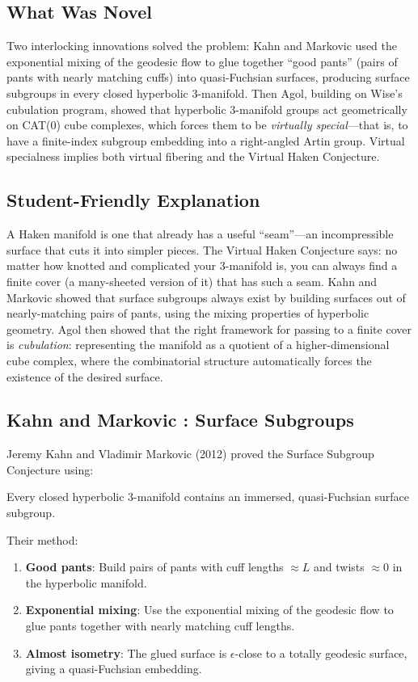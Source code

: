 \subsection{What Was Novel}
Two interlocking innovations solved the problem: Kahn and Markovic used the exponential mixing of the geodesic flow to glue together ``good pants'' (pairs of pants with nearly matching cuffs) into quasi-Fuchsian surfaces, producing surface subgroups in every closed hyperbolic 3-manifold. Then Agol, building on Wise's cubulation program, showed that hyperbolic 3-manifold groups act geometrically on CAT(0) cube complexes, which forces them to be \emph{virtually special}---that is, to have a finite-index subgroup embedding into a right-angled Artin group. Virtual specialness implies both virtual fibering and the Virtual Haken Conjecture.

\subsection{Student-Friendly Explanation}
A Haken manifold is one that already has a useful ``seam''---an incompressible surface that cuts it into simpler pieces. The Virtual Haken Conjecture says: no matter how knotted and complicated your 3-manifold is, you can always find a finite cover (a many-sheeted version of it) that has such a seam. Kahn and Markovic showed that surface subgroups always exist by building surfaces out of nearly-matching pairs of pants, using the mixing properties of hyperbolic geometry. Agol then showed that the right framework for passing to a finite cover is \emph{cubulation}: representing the manifold as a quotient of a higher-dimensional cube complex, where the combinatorial structure automatically forces the existence of the desired surface.

\subsection{Kahn and Markovic \cite{kahnmarkovic2012}: Surface Subgroups}
Jeremy Kahn and Vladimir Markovic (2012) proved the Surface Subgroup Conjecture using:

\begin{theorem}
Every closed hyperbolic 3-manifold contains an immersed, quasi-Fuchsian surface subgroup.
\end{theorem}

Their method:
\begin{enumerate}
\item \textbf{Good pants}: Build pairs of pants with cuff lengths $\approx L$ and twists $\approx 0$ in the hyperbolic manifold.
\item \textbf{Exponential mixing}: Use the exponential mixing of the geodesic flow to glue pants together with nearly matching cuff lengths.
\item \textbf{Almost isometry}: The glued surface is $\epsilon$-close to a totally geodesic surface, giving a quasi-Fuchsian embedding.
\end{enumerate}

